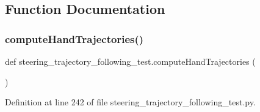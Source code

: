 \subsection{Function Documentation}
\mbox{\label{namespacesteering__trajectory__following__test_a378cc54eed1c58dc9d547aea3d6f14c9}} 
\subsubsection{\texorpdfstring{computeHandTrajectories()}{computeHandTrajectories()}}
{\footnotesize\ttfamily def steering\+\_\+trajectory\+\_\+following\+\_\+test.\+compute\+Hand\+Trajectories (\begin{DoxyParamCaption}{ }\end{DoxyParamCaption})}



Definition at line 242 of file steering\+\_\+trajectory\+\_\+following\+\_\+test.\+py.


